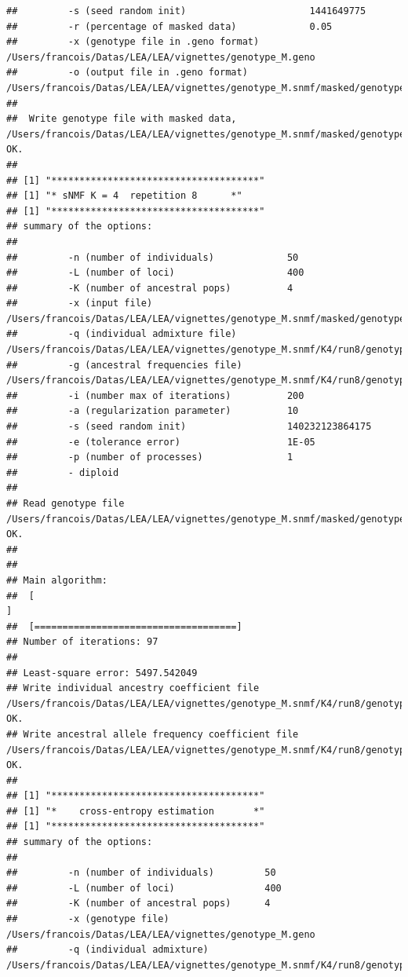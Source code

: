 \documentclass[12pt,a4paper,oneside]{article}\usepackage[]{graphicx}\usepackage[]{color}
\makeatletter
\newenvironment{kframe}{%
 \def\at@end@of@kframe{}%
 \ifinner\ifhmode%
  \def\at@end@of@kframe{\end{minipage}}%
  \begin{minipage}{\columnwidth}%
 \fi\fi%
 \def\FrameCommand##1{\hskip\@totalleftmargin \hskip-\fboxsep
 \colorbox{shadecolor}{##1}\hskip-\fboxsep
     \hskip-\linewidth \hskip-\@totalleftmargin \hskip\columnwidth}%
 \MakeFramed {\advance\hsize-\width
   \@totalleftmargin\z@ \linewidth\hsize
   \@setminipage}}%
 {\par\unskip\endMakeFramed%
 \at@end@of@kframe}
\newenvironment{knitrout}{}{} %
\makeatother
\begin{document}
\begin{knitrout}
\begin{kframe}
\begin{verbatim}
##         -s (seed random init)                      1441649775
##         -r (percentage of masked data)             0.05
##         -x (genotype file in .geno format)         /Users/francois/Datas/LEA/LEA/vignettes/genotype_M.geno
##         -o (output file in .geno format)           /Users/francois/Datas/LEA/LEA/vignettes/genotype_M.snmf/masked/genotype_M_I.geno
## 
##  Write genotype file with masked data, /Users/francois/Datas/LEA/LEA/vignettes/genotype_M.snmf/masked/genotype_M_I.geno:		OK.
## 
## [1] "*************************************"
## [1] "* sNMF K = 4  repetition 8      *"
## [1] "*************************************"
## summary of the options:
## 
##         -n (number of individuals)             50
##         -L (number of loci)                    400
##         -K (number of ancestral pops)          4
##         -x (input file)                        /Users/francois/Datas/LEA/LEA/vignettes/genotype_M.snmf/masked/genotype_M_I.geno
##         -q (individual admixture file)         /Users/francois/Datas/LEA/LEA/vignettes/genotype_M.snmf/K4/run8/genotype_M_r8.4.Q
##         -g (ancestral frequencies file)        /Users/francois/Datas/LEA/LEA/vignettes/genotype_M.snmf/K4/run8/genotype_M_r8.4.G
##         -i (number max of iterations)          200
##         -a (regularization parameter)          10
##         -s (seed random init)                  140232123864175
##         -e (tolerance error)                   1E-05
##         -p (number of processes)               1
##         - diploid
## 
## Read genotype file /Users/francois/Datas/LEA/LEA/vignettes/genotype_M.snmf/masked/genotype_M_I.geno:		OK.
## 
## 
## Main algorithm:
## 	[                                                                           ]
## 	[====================================]
## Number of iterations: 97
## 
## Least-square error: 5497.542049
## Write individual ancestry coefficient file /Users/francois/Datas/LEA/LEA/vignettes/genotype_M.snmf/K4/run8/genotype_M_r8.4.Q:		OK.
## Write ancestral allele frequency coefficient file /Users/francois/Datas/LEA/LEA/vignettes/genotype_M.snmf/K4/run8/genotype_M_r8.4.G:	OK.
## 
## [1] "*************************************"
## [1] "*    cross-entropy estimation       *"
## [1] "*************************************"
## summary of the options:
## 
##         -n (number of individuals)         50
##         -L (number of loci)                400
##         -K (number of ancestral pops)      4
##         -x (genotype file)                 /Users/francois/Datas/LEA/LEA/vignettes/genotype_M.geno
##         -q (individual admixture)          /Users/francois/Datas/LEA/LEA/vignettes/genotype_M.snmf/K4/run8/genotype_M_r8.4.Q

\end{verbatim}
\end{kframe}
\end{knitrout}
\end{document}
